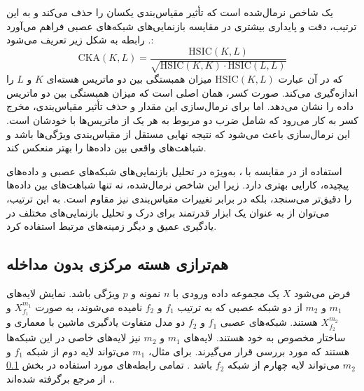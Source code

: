 یک شاخص نرمال‌شده است که تأثیر مقیاس‌بندی یکسان را حذف می‌کند و به این ترتیب، دقت و پایداری بیشتری در مقایسه بازنمایی‌های شبکه‌های عصبی فراهم می‌آورد
\cite{cortes2012algorithms, cristianini2001kernel}.
رابطه
به شکل زیر تعریف می‌شود:
\begin{equation}
	\text{CKA}(K, L) = \frac{\text{HSIC}(K, L)}{\sqrt{\text{HSIC}(K, K) \cdot \text{HSIC}(L, L)}}
	\label{eq_CKA}
\end{equation}
که در آن عبارت \(\text{HSIC}(K, L)\) میزان همبستگی بین دو ماتریس هسته‌ای \(K\) و \(L\) را اندازه‌گیری می‌کند. صورت کسر، همان
اصلی است که میزان همبستگی بین دو ماتریس داده را نشان می‌دهد. اما برای نرمال‌سازی این مقدار و حذف تأثیر مقیاس‌بندی، مخرج کسر به کار می‌رود که شامل ضرب دو
مربوط به هر یک از ماتریس‌ها با خودشان است. این نرمال‌سازی باعث می‌شود که نتیجه نهایی مستقل از مقیاس‌بندی ویژگی‌ها باشد و شباهت‌های واقعی بین داده‌ها را بهتر منعکس کند.

استفاده از
در مقایسه با
%
، به‌ویژه در تحلیل بازنمایی‌های شبکه‌های عصبی و داده‌های پیچیده، کارایی بهتری دارد. زیرا این شاخص نرمال‌شده، نه تنها شباهت‌های بین داده‌ها را دقیق‌تر می‌سنجد، بلکه در برابر تغییرات مقیاس‌بندی نیز مقاوم است. به این ترتیب، می‌توان از
به عنوان یک ابزار قدرتمند برای درک و تحلیل بازنمایی‌های مختلف در یادگیری عمیق و دیگر زمینه‌های مرتبط استفاده کرد.




\subsection{
	هم‌ترازی هسته مرکزی بدون مداخله%
}\label{sec_dCKA}
فرض می‌شود \(X\) یک مجموعه داده ورودی با \(n\) نمونه و \(p\) ویژگی باشد. نمایش‌ لایه‌های \(m_1\) و \(m_2\) از دو شبکه عصبی که به ترتیب \(f_1\) و \(f_2\) نامیده می‌شوند، به صورت \(X^{m_1}_{f_1}\) و \(X^{m_2}_{f_2}\) هستند. شبکه‌های عصبی \(f_1\) و \(f_2\) دو مدل متفاوت یادگیری ماشین با معماری و ساختار مخصوص به خود هستند. لایه‌های \(m_1\) و \(m_2\) نیز لایه‌های خاصی در این شبکه‌ها هستند که مورد بررسی قرار می‌گیرند. برای مثال، \(m_1\) می‌تواند لایه دوم از شبکه \(f_1\) و \(m_2\) می‌تواند لایه چهارم از شبکه \(f_2\) باشد
\cite{cui2022deconfounded}.
تمامی رابطه‌های مورد استفاده در بخش
\ref{sec_dCKA}%
، از مرجع 
\cite{cui2022deconfounded} 
برگرفته شده‌اند.

